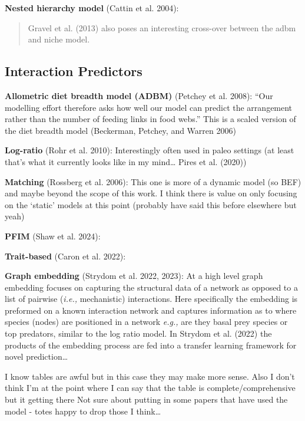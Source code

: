 \documentclass[
  letterpaper,
  DIV=11,
  numbers=noendperiod]{scrartcl}
\begin{document}
\textbf{Nested hierarchy model} (Cattin et al. 2004):

\begin{quote}
Gravel et al. (2013) also poses an interesting cross-over between the
adbm and niche model.
\end{quote}

\subsection{Interaction Predictors}\label{interaction-predictors}

\textbf{Allometric diet breadth model (ADBM)} (Petchey et al. 2008):
``Our modelling effort therefore asks how well our model can predict the
arrangement rather than the number of feeding links in food webs.'' This
is a scaled version of the diet breadth model (Beckerman, Petchey, and
Warren 2006)

\textbf{Log-ratio} (Rohr et al. 2010): Interestingly often used in paleo
settings (at least that's what it currently looks like in my
mind\ldots{} Pires et al. (2020))

\textbf{Matching} (Rossberg et al. 2006): This one is more of a dynamic
model (so BEF) and maybe beyond the scope of this work. I think there is
value on only focusing on the `static' models at this point (probably
have said this before elsewhere but yeah)

\textbf{PFIM} (Shaw et al. 2024):

\textbf{Trait-based} (Caron et al. 2022):

\textbf{Graph embedding} (Strydom et al. 2022, 2023): At a high level
graph embedding focuses on capturing the structural data of a network as
opposed to a list of pairwise (\emph{i.e.,} mechanistic) interactions.
Here specifically the embedding is preformed on a known interaction
network and captures information as to where species (nodes) are
positioned in a network \emph{e.g.,} are they basal prey species or top
predators, similar to the log ratio model. In Strydom et al. (2022) the
products of the embedding process are fed into a transfer learning
framework for novel prediction\ldots{}

I know tables are awful but in this case they may make more sense. Also
I don't think I'm at the point where I can say that the table is
complete/comprehensive but it getting there Not sure about putting in
some papers that have used the model - totes happy to drop those I
think\ldots{}
\end{document}
